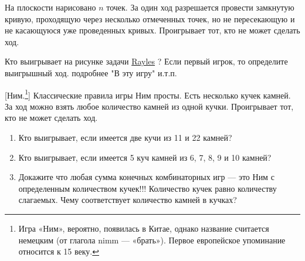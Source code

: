 \begin{problem}
На плоскости нарисовано  $n$  точек. За один ход разрешается провести замкнутую кривую, проходящую через несколько отмеченных точек, но не пересекающую и не касающуюся уже проведенных кривых. Проигрывает тот, кто не может сделать ход.\par
Кто выигрывает на рисунке задачи \hyperref[Rayles]{Rayles} ? Если первый игрок, то определите выигрышный ход. {\red подробнее "В эту игру" и.т.п.}

\begin{sol}

\end{sol}
\end{problem}



\begin{problem}\label{Z:Nim}[Ним.\footnote{Игра «Ним», вероятно, появилась в Китае, однако название считается немецким (от глагола nimm — «брать»). Первое европейское упоминание относится к 15 веку.}]
Классические правила игры Ним просты. Есть несколько кучек камней. За ход можно взять любое количество камней из одной кучки. Проигрывает тот, кто не может сделать ход.\par
\begin{enumerate}
\item 	Кто выигрывает, если имеется две кучи из 11 и 22 камней?\par
\item 	Кто выигрывает, если имеется 5 куч камней из 6, 7, 8, 9 и 10 камней?\par
\item 	Докажите что любая сумма конечных комбинаторных игр — это Ним с определенным количеством кучек!!! Количество кучек равно количеству слагаемых. Чему соответствует количество камней в кучках?
\end{enumerate}



\begin{sol}

\end{sol}
\end{problem}



